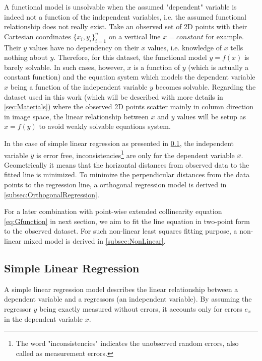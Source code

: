 A functional model is unsolvable when the assumed "dependent" variable is indeed not a function of the independent variables, i.e. the assumed functional relationship does not really exist. Take an observed set of 2D points with their Cartesian coordinates $\{x_i,y_i\}^n_{i=1}$ on a vertical line $x=constant$ for example. Their $y$ values have no dependency on their $x$ values, i.e. knowledge of $x$ tells nothing about $y$. Therefore, for this dataset, the functional model $y=f(x)$ is barely solvable. In such cases, however, $x$ is a function of $y$ (which is actually a constant function) and the equation system which models the dependent variable $x$ being a function of the independent variable $y$ becomes solvable. Regarding the dataset used in this work (which will be described with more details in \cref{sec:Materials}) where the observed 2D points scatter mainly in column direction in image space, the linear relationship between $x$ and $y$ values will be setup as $x=f(y)$ to avoid weakly solvable equations system.

In the case of simple linear regression as presented in \cref{subsec:LinearRegression}, the independent variable $y$ is error free, inconsistencies\footnote{The word "inconsistencies" indicates the unobserved random errors, also called as measurement errors.} are only for the dependent variable $x$. Geometrically it means that the horizontal distances from observed data to the fitted line is minimized. To minimize the %
perpendicular distances from the data points to the regression line, a orthogonal regression model is derived in \cref{subsec:OrthogonalRegression}.

For a later combination with point-wise extended collinearity equation \eqref{eq:Gfunction} in next section, we aim to fit the line equation in two-point form to the observed dataset. 
For such non-linear least squares fitting purpose, a non-linear mixed model is derived in \cref{subsec:NonLinear}. %


\subsection{Simple Linear Regression}
\label{subsec:LinearRegression}

A simple linear regression model describes the linear relationship between a dependent variable and a regressors (an independent variable). By assuming the regressor $y$ being exactly measured without errors, it accounts only for errors $e_x$ in the dependent variable $x$.

